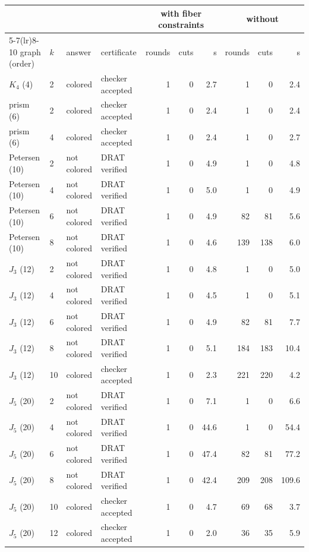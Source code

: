 \begin{table}[tbp]\centering\footnotesize
\begin{tabular}{llllrrrrrr}
\toprule
 & & & & \multicolumn{3}{c}{with fiber constraints} & \multicolumn{3}{c}{without} \\
\cmidrule(lr){5-7}\cmidrule(lr){8-10}
graph (order) & $k$ & answer & certificate & rounds & cuts & s & rounds & cuts & s\\
\midrule
$K_4$ (4) & 2 & colored & checker accepted & 1 & 0 & 2.7 & 1 & 0 & 2.4 \\
\midrule
prism (6) & 2 & colored & checker accepted & 1 & 0 & 2.4 & 1 & 0 & 2.4 \\
prism (6) & 4 & colored & checker accepted & 1 & 0 & 2.4 & 1 & 0 & 2.7 \\
\midrule
Petersen (10) & 2 & not colored & DRAT verified & 1 & 0 & 4.9 & 1 & 0 & 4.8 \\
Petersen (10) & 4 & not colored & DRAT verified & 1 & 0 & 5.0 & 1 & 0 & 4.9 \\
Petersen (10) & 6 & not colored & DRAT verified & 1 & 0 & 4.9 & 82 & 81 & 5.6 \\
Petersen (10) & 8 & not colored & DRAT verified & 1 & 0 & 4.6 & 139 & 138 & 6.0 \\
\midrule
$J_3$ (12) & 2 & not colored & DRAT verified & 1 & 0 & 4.8 & 1 & 0 & 5.0 \\
$J_3$ (12) & 4 & not colored & DRAT verified & 1 & 0 & 4.5 & 1 & 0 & 5.1 \\
$J_3$ (12) & 6 & not colored & DRAT verified & 1 & 0 & 4.9 & 82 & 81 & 7.7 \\
$J_3$ (12) & 8 & not colored & DRAT verified & 1 & 0 & 5.1 & 184 & 183 & 10.4 \\
$J_3$ (12) & 10 & colored & checker accepted & 1 & 0 & 2.3 & 221 & 220 & 4.2 \\
\midrule
$J_5$ (20) & 2 & not colored & DRAT verified & 1 & 0 & 7.1 & 1 & 0 & 6.6 \\
$J_5$ (20) & 4 & not colored & DRAT verified & 1 & 0 & 44.6 & 1 & 0 & 54.4 \\
$J_5$ (20) & 6 & not colored & DRAT verified & 1 & 0 & 47.4 & 82 & 81 & 77.2 \\
$J_5$ (20) & 8 & not colored & DRAT verified & 1 & 0 & 42.4 & 209 & 208 & 109.6 \\
$J_5$ (20) & 10 & colored & checker accepted & 1 & 0 & 4.7 & 69 & 68 & 3.7 \\
$J_5$ (20) & 12 & colored & checker accepted & 1 & 0 & 2.0 & 36 & 35 & 5.9 \\

\end{tabular}
\end{table}
